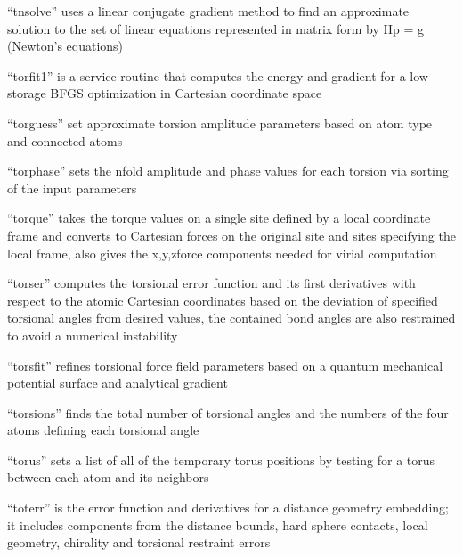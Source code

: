 \documentclass[letterpaper,11pt,english]{sphinxmanual}
\begin{document}

“tnsolve” uses a linear conjugate gradient method to find
an approximate solution to the set of linear equations
represented in matrix form by Hp = \sphinxhyphen{}g (Newton’s equations)


“torfit1” is a service routine that computes the energy and
gradient for a low storage BFGS optimization in Cartesian
coordinate space


“torguess” set approximate torsion amplitude parameters based
on atom type and connected atoms


“torphase” sets the n\sphinxhyphen{}fold amplitude and phase values
for each torsion via sorting of the input parameters


“torque” takes the torque values on a single site defined by
a local coordinate frame and converts to Cartesian forces on
the original site and sites specifying the local frame, also
gives the x,y,z\sphinxhyphen{}force components needed for virial computation


“torser” computes the torsional error function and its first
derivatives with respect to the atomic Cartesian coordinates
based on the deviation of specified torsional angles from
desired values, the contained bond angles are also restrained
to avoid a numerical instability


“torsfit” refines torsional force field parameters based on
a quantum mechanical potential surface and analytical gradient


“torsions” finds the total number of torsional angles and
the numbers of the four atoms defining each torsional angle


“torus” sets a list of all of the temporary torus positions
by testing for a torus between each atom and its neighbors


“toterr” is the error function and derivatives for a distance
geometry embedding; it includes components from the distance
bounds, hard sphere contacts, local geometry, chirality and
torsional restraint errors
\end{document}
